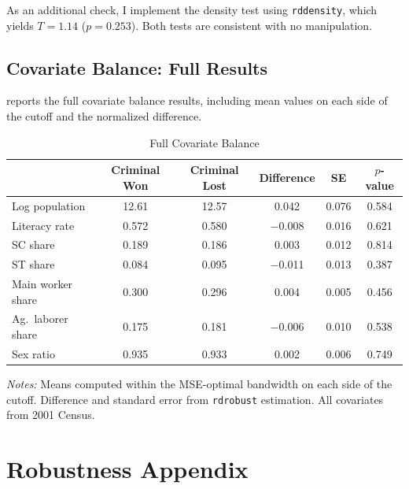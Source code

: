 \documentclass[12pt]{article}
\begin{document}
As an additional check, I implement the \citet{cattaneo2020practical} density test using \texttt{rddensity}, which yields $T = 1.14$ ($p = 0.253$). Both tests are consistent with no manipulation.

\subsection{Covariate Balance: Full Results}

 reports the full covariate balance results, including mean values on each side of the cutoff and the normalized difference.

\begin{table}[H]
\centering
\caption{Full Covariate Balance}
\label{tab:balance_full}
\begin{threeparttable}
\begin{tabular}{lccccc}
\toprule
 & Criminal Won & Criminal Lost & Difference & SE & $p$-value \\
\midrule
Log population & 12.61 & 12.57 & 0.042 & 0.076 & 0.584 \\
Literacy rate & 0.572 & 0.580 & $-$0.008 & 0.016 & 0.621 \\
SC share & 0.189 & 0.186 & 0.003 & 0.012 & 0.814 \\
ST share & 0.084 & 0.095 & $-$0.011 & 0.013 & 0.387 \\
Main worker share & 0.300 & 0.296 & 0.004 & 0.005 & 0.456 \\
Ag.\ laborer share & 0.175 & 0.181 & $-$0.006 & 0.010 & 0.538 \\
Sex ratio & 0.935 & 0.933 & 0.002 & 0.006 & 0.749 \\
\bottomrule
\end{tabular}
\begin{tablenotes}[flushleft]
\small
\item \textit{Notes:} Means computed within the MSE-optimal bandwidth on each side of the cutoff. Difference and standard error from \texttt{rdrobust} estimation. All covariates from 2001 Census.
\end{tablenotes}
\end{threeparttable}
\end{table}


\section{Robustness Appendix}
\label{app:robustness}
\end{document}

